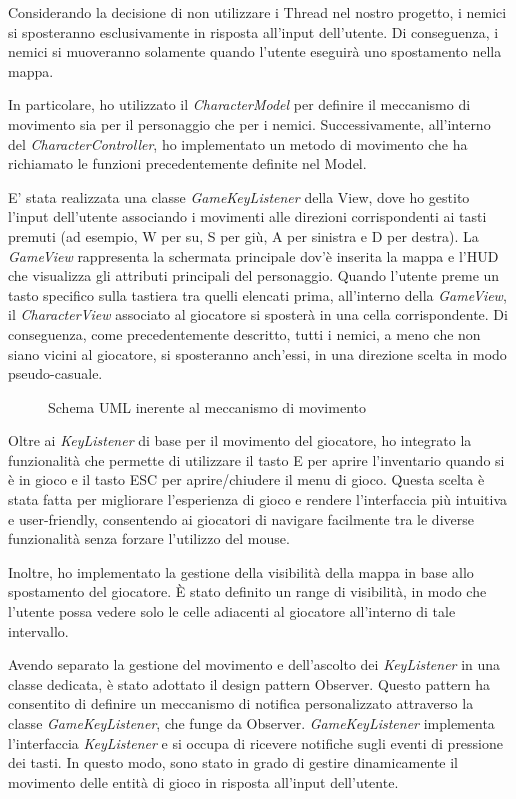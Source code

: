 \documentclass[a4paper,12pt]{report}
\begin{document}
Considerando la decisione di non utilizzare i Thread nel nostro progetto, i nemici si sposteranno esclusivamente in risposta all'input dell'utente. Di conseguenza, i nemici si muoveranno solamente quando l'utente eseguirà uno spostamento nella mappa.

In particolare, ho utilizzato il \textit{CharacterModel} per definire il meccanismo di movimento sia per il personaggio che per i nemici. Successivamente, all'interno del \textit{CharacterController}, ho implementato un metodo di movimento che ha richiamato le funzioni precedentemente definite nel Model. 

E' stata realizzata una classe \textit{GameKeyListener} della View, dove ho gestito l'input dell'utente associando i movimenti alle direzioni corrispondenti ai tasti premuti (ad esempio, W per su, S per giù, A per sinistra e D per	destra). La \textit{GameView} rappresenta la schermata principale dov'è inserita la mappa e l'HUD che visualizza gli attributi principali del personaggio.
Quando l'utente preme un tasto specifico sulla tastiera tra quelli elencati prima, all'interno della \textit{GameView}, il \textit{CharacterView} associato al giocatore si sposterà in una cella corrispondente. Di conseguenza, come precedentemente descritto, tutti i nemici, a meno che non siano vicini al giocatore, si sposteranno anch'essi, in una direzione scelta in modo pseudo-casuale.

\begin{figure}[H]
	\centering
	
	\caption{Schema UML inerente al meccanismo di movimento}
	\label{fig:the-exiled-movement-uml}
\end{figure}

Oltre ai \textit{KeyListener} di base per il movimento del giocatore, ho integrato la funzionalità che permette di utilizzare il tasto E per aprire l'inventario quando si è in gioco e il tasto ESC per aprire/chiudere il menu di gioco. Questa scelta è stata fatta per migliorare l'esperienza di gioco e rendere l'interfaccia più intuitiva e user-friendly, consentendo ai giocatori di navigare facilmente tra le diverse funzionalità senza forzare l'utilizzo del mouse.

Inoltre, ho implementato la gestione della visibilità della mappa in base allo spostamento del giocatore. È stato definito un range di visibilità, in modo che l'utente possa vedere solo le celle adiacenti al giocatore all'interno di tale intervallo.

Avendo separato la gestione del movimento e dell'ascolto dei \textit{KeyListener} in una classe dedicata, è stato adottato il design pattern Observer. Questo pattern ha consentito di definire un meccanismo di notifica personalizzato attraverso la classe \textit{GameKeyListener}, che funge da Observer. \textit{GameKeyListener} implementa l'interfaccia \textit{KeyListener} e si occupa di ricevere notifiche sugli eventi di pressione dei tasti. In questo modo, sono stato in grado di gestire dinamicamente il movimento delle entità di gioco in risposta all'input dell'utente.
\end{document}
